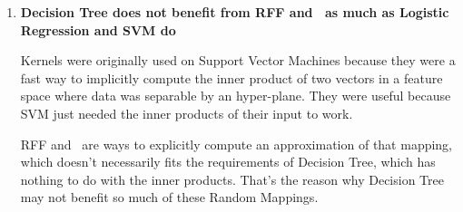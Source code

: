 \begin{pre-delivery}
\begin{enumerate}
    It is possible that for some models, this is too much randomization of
    the data, and it could have a bad effect on the learning process.

    \item \textbf{Decision Tree does not benefit from RFF and \Nys\ as much as
    Logistic Regression and SVM do}

    Kernels were originally used on Support Vector Machines because they were
    a fast way to implicitly compute the inner product of two vectors in a
    feature space where data was separable by an hyper-plane. They were
    useful because SVM just needed the inner products of their input to work.

    RFF and \Nys\ are ways to explicitly compute an approximation of that
    mapping, which doesn't necessarily fits the requirements of Decision Tree,
    which has nothing to do with the inner products. That's the reason why
    Decision Tree may not benefit so much of these Random Mappings.
  \end{enumerate}
\end{pre-delivery}
